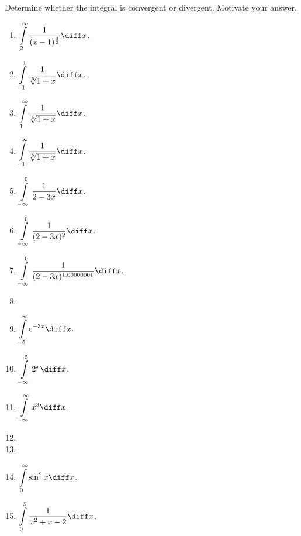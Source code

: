 Determine whether the integral is convergent or divergent. Motivate your answer.
\begin{multicols}{2}
\begin{enumerate}[ref={\fcProblemRef}]
\item $\displaystyle \int\limits_{2}^{\infty}\frac{1}{(x-1)^{\frac32}} \diff x$.

\item $\displaystyle \int\limits_{-1}^{1}\frac{1}{\sqrt[5]{1+x}} \diff x$.

\item $\displaystyle \int\limits_{1}^{\infty }\frac{1}{\sqrt[5]{1+x}} \diff x$.

\item $\displaystyle \int\limits_{-1}^{\infty }\frac{1}{\sqrt[5]{1+x}} \diff x$.

\item $\displaystyle \int\limits_{-\infty }^{0}\frac{1}{2-3x} \diff x$.

\item $\displaystyle \int\limits_{-\infty }^{0}\frac{1}{(2-3x)^{2}} \diff x$.

\item $\displaystyle \int\limits_{-\infty }^{0}\frac{1}{(2-3x)^{1.00000001}} \diff x$.

\item 
\item $\displaystyle \int\limits_{-5}^{\infty} e^{-3x} \diff x$.

\item $\displaystyle \int\limits_{-\infty }^{5}  2^x \diff x$.

\item $\displaystyle \int\limits_{-\infty }^{\infty}x^3 \diff x$.

\item  
\item 
\item $\displaystyle \int\limits_{0}^{\infty}\sin^2 x \diff x$.

\item $\displaystyle \int\limits_{0}^{5}\frac{1}{x^2+x-2} \diff x$.


\end{enumerate}
\end{multicols}
